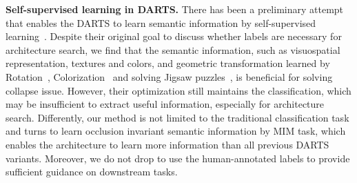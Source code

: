 \documentclass[10pt,twocolumn,letterpaper]{article}
\newcommand{\mypara}[1]{\vspace{1mm}\noindent\textbf{#1}}
\begin{document}
\mypara{Self-supervised learning in DARTS.}
There has been a preliminary attempt that enables the DARTS to learn semantic information by self-supervised learning~\cite{liu_2020_unnas}.
Despite their original goal to discuss whether labels are necessary for architecture search, 
we find that the semantic information, such as visuospatial representation, textures and colors, and geometric transformation learned by Rotation~\cite{gidaris_2018_rotation}, Colorization~\cite{zhang_2016_col} and solving Jigsaw puzzles~\cite{noroozi_2016_jigsaw},
is beneficial for solving collapse issue.
However, 
their optimization still maintains the classification, which may be insufficient to extract useful information, especially for architecture search.
Differently, 
our method is not limited to the traditional classification task and turns to learn occlusion invariant semantic information by MIM task,
which enables the architecture to learn more information than all previous DARTS variants.
Moreover, we do not drop to use the human-annotated labels to provide sufficient guidance on downstream tasks.
\end{document}
